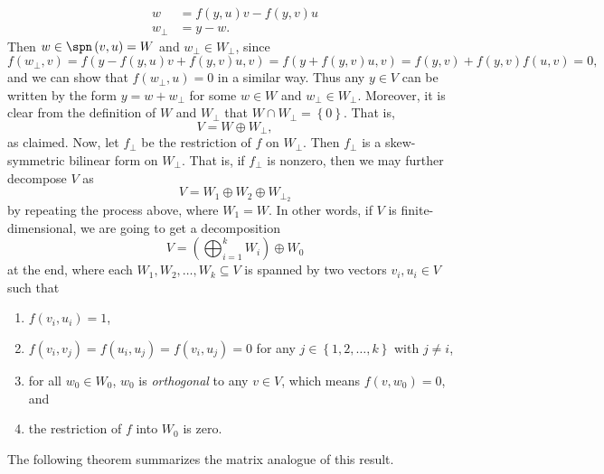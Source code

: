\documentclass[linearalgebra]{subfiles}
\begin{document}
\begin{remark}
        \begin{align*}
            w & = f\left( y,u \right) v - f\left( y,v \right) u \\
            w_\perp &= y-w.
        \end{align*} 
        Then $w\in\spn\left( v,u \right) = W$ and $w_\perp\in W_\perp$, since
        \begin{equation*}
            f\left( w_\perp, v \right) = f\left( y-f\left( y,u \right) v + f\left( y,v \right) u, v\right) = f\left( y+f(y,v)u, v \right) = f\left( y,v \right) + f\left( y,v \right) f(u,v) = 0, 
        \end{equation*}
        and we can show that $f\left( w_\perp, u \right) =0$ in a similar way. Thus any $y\in V$ can be written by the form $y = w + w_\perp$ for some $w\in W$ and $w_\perp\in W_\perp$. Moreover, it is clear from the definition of $W$ and $W_\perp$ that $W\cap W_\perp = \left\lbrace 0 \right\rbrace $. That is,
        \begin{equation*}
            V = W\oplus W_\perp,
        \end{equation*}
        as claimed. Now, let $f_\perp$ be the restriction of $f$ on $W_\perp$. Then $f_\perp$ is a skew-symmetric bilinear form on $W_\perp$. That is, if $f_\perp$ is nonzero, then we may further decompose $V$ as
        \begin{equation*}
            V = W_1\oplus W_2\oplus W_{\perp_2}
        \end{equation*}
        by repeating the process above, where $W_1 = W$. In other words, if $V$ is finite-dimensional, we are going to get a decomposition
        \begin{equation*}
            V = \left( \bigoplus^{k}_{i=1} W_i \right) \oplus W_0
        \end{equation*}
        at the end, where each $W_1,W_2, \ldots, W_k\subseteq V$ is spanned by two vectors $v_i, u_i\in V$ such that
        \begin{enumerate}
            \item $f\left( v_i,u_i \right) = 1$,
            \item $f\left( v_i, v_j \right) = f\left( u_i,u_j \right) = f\left( v_i,u_j \right) = 0$ for any $j\in \left\lbrace 1,2,\ldots,k \right\rbrace$ with $j\neq i$, 
            \item for all $w_0\in W_0$, $w_0$ is \textit{orthogonal} to any $v\in V$, which means $f\left( v, w_0 \right) = 0$, and
            \item the restriction of $f$ into $W_0$ is zero.
        \end{enumerate}
        The following theorem summarizes the matrix analogue of this result.
    \end{remark}
\end{document}

